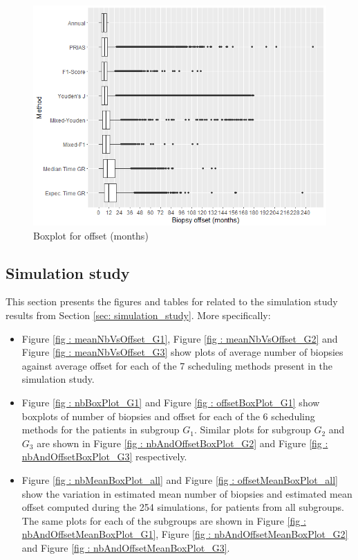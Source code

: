 \begin{figure}
	\centerline{\includegraphics[width=\columnwidth]{images/sim_study/offsetBoxPlot_all.png}}
    \caption{Boxplot for offset (months)}
    \label{fig : offsetBoxPlot}
\end{figure}



\subsection{Simulation study}
This section presents the figures and tables for related to the simulation study results from Section \ref{sec: simulation_study}. More specifically:

\begin{itemize}
  \item Figure \ref{fig : meanNbVsOffset_G1}, Figure \ref{fig : meanNbVsOffset_G2} and Figure \ref{fig : meanNbVsOffset_G3} show plots of average number of biopsies against average offset for each of the 7 scheduling methods present in the simulation study.
  \item Figure \ref{fig : nbBoxPlot_G1} and Figure \ref{fig : offsetBoxPlot_G1} show boxplots of number of biopsies and offset for each of the 6 scheduling methods for the patients in subgroup $G_1$. Similar plots for subgroup $G_2$ and $G_3$ are shown in Figure \ref{fig : nbAndOffsetBoxPlot_G2} and Figure \ref{fig : nbAndOffsetBoxPlot_G3} respectively.
  \item Figure \ref{fig : nbMeanBoxPlot_all} and Figure \ref{fig : offsetMeanBoxPlot_all} show the variation in estimated mean number of biopsies and estimated mean offset computed during the 254 simulations, for patients from all subgroups. The same plots for each of the subgroups are shown in Figure \ref{fig : nbAndOffsetMeanBoxPlot_G1}, Figure \ref{fig : nbAndOffsetMeanBoxPlot_G2} and Figure \ref{fig : nbAndOffsetMeanBoxPlot_G3}.
\end{itemize} 

